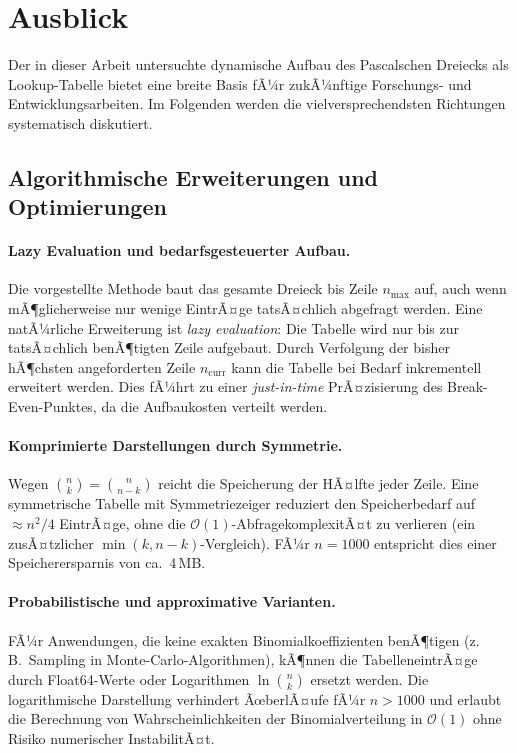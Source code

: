 ﻿\documentclass[12pt, a4paper]{article}
\newcommand{\Oh}{\mathcal{O}}
\theoremstyle{plain}
\theoremstyle{definition}
\theoremstyle{remark}
\renewcommand{\Oh}{\mathcal{O}}
\begin{document}
\section{Ausblick}
\label{sec:ausblick}

Der in dieser Arbeit untersuchte dynamische Aufbau des Pascalschen
Dreiecks als Lookup-Tabelle bietet eine breite Basis fÃ¼r zukÃ¼nftige
Forschungs- und Entwicklungsarbeiten. Im Folgenden werden die
vielversprechendsten Richtungen systematisch diskutiert.

\subsection{Algorithmische Erweiterungen und Optimierungen}

\paragraph{Lazy Evaluation und bedarfsgesteuerter Aufbau.}
Die vorgestellte Methode baut das gesamte Dreieck bis Zeile $n_{\max}$
auf, auch wenn mÃ¶glicherweise nur wenige EintrÃ¤ge tatsÃ¤chlich abgefragt
werden. Eine natÃ¼rliche Erweiterung ist \emph{lazy evaluation}: Die
Tabelle wird nur bis zur tatsÃ¤chlich benÃ¶tigten Zeile aufgebaut.
Durch Verfolgung der bisher hÃ¶chsten angeforderten Zeile $n_{\text{curr}}$
kann die Tabelle bei Bedarf inkrementell erweitert werden. Dies fÃ¼hrt zu
einer \emph{just-in-time} PrÃ¤zisierung des Break-Even-Punktes, da die
Aufbaukosten verteilt werden.

\paragraph{Komprimierte Darstellungen durch Symmetrie.}
Wegen $\binom{n}{k} = \binom{n}{n-k}$ reicht die Speicherung der
HÃ¤lfte jeder Zeile. Eine symmetrische Tabelle mit Symmetriezeiger
reduziert den Speicherbedarf auf $\approx n^2/4$ EintrÃ¤ge, ohne die
$\Oh(1)$-AbfragekomplexitÃ¤t zu verlieren (ein zusÃ¤tzlicher
$\min(k, n-k)$-Vergleich). FÃ¼r $n = 1000$ entspricht dies einer
Speicherersparnis von ca.\ 4\,MB.

\paragraph{Probabilistische und approximative Varianten.}
FÃ¼r Anwendungen, die keine exakten Binomialkoeffizienten benÃ¶tigen
(z.\,B.\ Sampling in Monte-Carlo-Algorithmen), kÃ¶nnen die
TabelleneintrÃ¤ge durch Float64-Werte oder Logarithmen $\ln\binom{n}{k}$
ersetzt werden. Die logarithmische Darstellung verhindert ÃœberlÃ¤ufe fÃ¼r
$n > 1000$ und erlaubt die Berechnung von Wahrscheinlichkeiten der
Binomialverteilung in $\Oh(1)$ ohne Risiko numerischer InstabilitÃ¤t.
\end{document}
